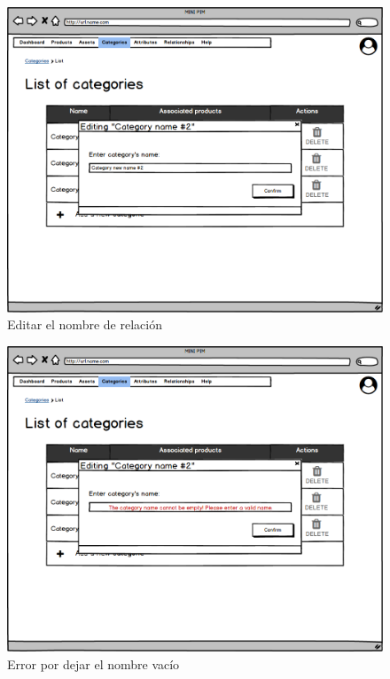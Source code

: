 \vspace{0.20cm}

\begin{figure}[H]
    \includegraphics[width=1\linewidth]{mockups/RF4.3_1.png}
    \caption{Editar el nombre de relación}
   \end{figure}
\vspace{1.0cm}

\begin{figure}[H]
    \includegraphics[width=1\linewidth]{mockups/RF4.3_2.png}
    \caption{Error por dejar el nombre vacío}
   \end{figure}
\vspace{1.0cm}

\newpage %